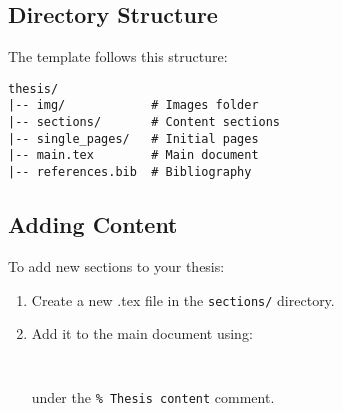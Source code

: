 \newpage
\subsection{Directory Structure}
The template follows this structure:
\begin{verbatim}
thesis/
|-- img/            # Images folder
|-- sections/       # Content sections
|-- single_pages/   # Initial pages
|-- main.tex        # Main document
|-- references.bib  # Bibliography
\end{verbatim}

\subsection{Adding Content}
To add new sections to your thesis:
\begin{enumerate}
    \item Create a new .tex file in the \texttt{sections/} directory.
    \item Add it to the main document using:
    \begin{verbatim}
    
    \end{verbatim}
    under the \texttt{\% Thesis content} comment.
\end{enumerate}

